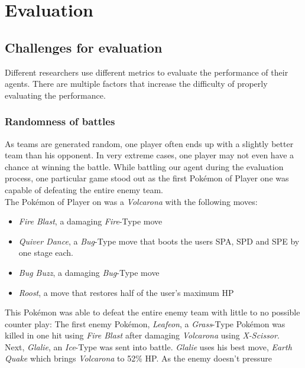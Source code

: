 
\chapter{Evaluation}
\label{ch:evaluation}

\section{Challenges for evaluation}
\label{sec:eval-challenges}

Different researchers use different metrics to evaluate the performance of their agents. 
There are multiple factors that increase the difficulty of properly evaluating the performance.

\subsection{Randomness of battles}
\label{sec:eval-challenges-randomness}
As teams are generated random, one player often ends up with a slightly better team than his opponent.
In very extreme cases, one player may not even have a chance at winning the battle. While battling
our agent during the evaluation process, one particular game stood out as the first Pokémon of 
Player one was capable of defeating the entire enemy team. \\
The Pokémon of Player on was a \textit{Volcarona} with the following moves:
\begin{itemize}
    \item \textit{Fire Blast}, a damaging \textit{Fire}-Type move
    \item \textit{Quiver Dance}, a \textit{Bug}-Type move that boots the users \ac{SPA}, \ac{SPD} and 
    \ac{SPE} by one stage each.
    \item \textit{Bug Buzz}, a damaging \textit{Bug}-Type move
    \item \textit{Roost}, a move that restores half of the user's maximum \ac{HP}
\end{itemize}
This Pokémon was able to defeat the entire enemy team with little to no possible counter play:
The first enemy Pokémon, \textit{Leafeon}, a \textit{Grass}-Type Pokémon was killed in one hit using
\textit{Fire Blast} after damaging \textit{Volcarona} using \textit{X-Scissor}. \\
Next, \textit{Glalie}, an \textit{Ice}-Type was sent into battle. \textit{Glalie} uses his best move,
\textit{Earth Quake} which brings \textit{Volcarona} to 52\% \ac{HP}. As the enemy doesn't pressure
